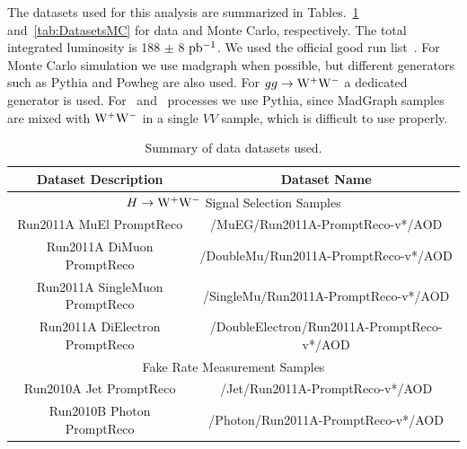 The datasets used for this analysis are summarized in 
Tables.~\ref{tab:DatasetsData} and~\ref{tab:DatasetsMC} for data and Monte 
Carlo, respectively. The total integrated luminosity is 188 $\pm$ 8 $\mathrm{pb^{-1}}$. 
We used the official good run list~\cite{json}. For Monte Carlo simulation 
we use madgraph when possible, 
but different generators such as Pythia and Powheg 
are also used. 
For $gg \to \mathrm{W}^+\mathrm{W}^-$ a dedicated generator is used. For \wz\ and \zz\
processes we use Pythia, since MadGraph samples are mixed with $\mathrm{W}^+\mathrm{W}^-$ in
a single $VV$ sample, which is difficult to use properly.

\begin{table}[!ht]
\begin{center}
\begin{tabular}{|c|c|}
\hline
 Dataset Description                   &   Dataset Name   \\
\hline
\hline
\multicolumn{2}{|c|}{$H \to \mathrm{W}^+\mathrm{W}^-$ Signal Selection Samples} \\
\hline
Run2011A MuEl PromptReco            &  /MuEG/Run2011A-PromptReco-v*/AOD   \\
Run2011A DiMuon PromptReco          &  /DoubleMu/Run2011A-PromptReco-v*/AOD   \\
Run2011A SingleMuon PromptReco      &  /SingleMu/Run2011A-PromptReco-v*/AOD   \\
Run2011A DiElectron PromptReco      &  /DoubleElectron/Run2011A-PromptReco-v*/AOD   \\
\hline
\hline
\multicolumn{2}{|c|}{Fake Rate Measurement Samples} \\
\hline
Run2010A Jet  PromptReco            & /Jet/Run2011A-PromptReco-v*/AOD	\\
Run2010B Photon PromptReco          & /Photon/Run2011A-PromptReco-v*/AOD \\
\hline
\end{tabular}
\caption{Summary of data datasets used.\label{tab:DatasetsData}}
\end{center}
\end{table}

